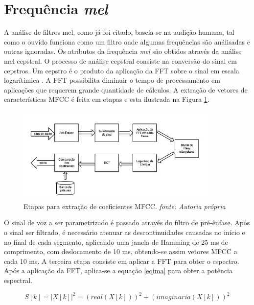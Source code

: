 \section{Frequência \textit{mel}}

\quad A análise de filtros mel, como já foi citado, baseia-se na audição humana, tal como o ouvido funciona como um filtro onde algumas frequências são análisadas e outras ignoradas. Os atributos da frequência \textit{mel} são obtidos através da análise mel cepstral. O processo de análise  cepstral consiste na conversão do sinal em cepstros. Um cepstro é o produto da aplicação da FFT sobre o sinal em escala logarítimica \cite{mfcci3e}. A FFT possibilita diminuir o tempo de processamento em aplicações que requerem grande quantidade de cálculos.
A extração de vetores de características MFCC é feita em etapas e esta ilustrada na Figura \ref{fig:diaMFCC}. 
\begin{figure}[H]
\centering %
\includegraphics[width=10cm]{img/diaMFCC.jpg} %
\caption{Etapas para extração de coeficientes MFCC. \textit{fonte: Autoria própria}}
\label{fig:diaMFCC}
\end{figure}


O sinal de voz a ser parametrizado é passado através do filtro de pré-ênfase. Após o sinal ser filtrado, é necessário atenuar as descontinuidades causadas no início e no final de cada segmento, aplicando uma janela de Hamming de 25 ms de comprimento, com deslocamento de 10 ms, obtendo-se assim vetores MFCC a cada 10 ms. A terceira etapa consiste em aplicar a FFT para obter o espectro. Após a aplicação da FFT, aplica-se a equação \ref{eqima} para obter a potência espectral.

\begin{equation}
\label{eqima}
S[k] = |X[k]|^2 = (real(X[k]))^2 +  (imaginaria(X[k]))^2
\end{equation}


